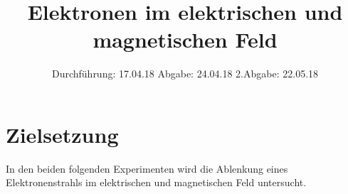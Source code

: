 

\subject{V501/V502}
\title{Elektronen im elektrischen und magnetischen Feld}
\date{%
  Durchführung: 17.04.18
  \hspace{3em}
  Abgabe: 24.04.18
  \hspace{10em}
  2.Abgabe: 22.05.18
}



\maketitle
\thispagestyle{empty}
\tableofcontents
\newpage

\section{Zielsetzung}
\label{sec:Zielsetzung}

In den beiden folgenden Experimenten wird die Ablenkung eines Elektronenstrahls im elektrischen und magnetischen Feld untersucht.







\printbibliography{}


